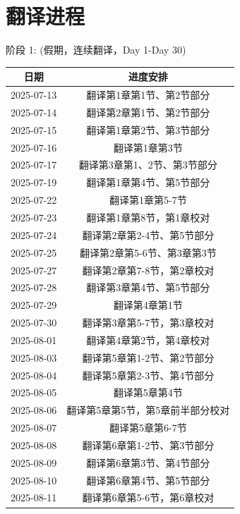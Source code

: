 \documentclass{ctexart}
\begin{document}
\section*{翻译进程}

阶段 1: (假期，连续翻译，Day 1-Day 30)

\begin{table}[h]
    \centering
    \begin{tabular}{|c|c|}
    \hline
    \textbf{日期} & \textbf{进度安排}  \\ \hline
    2025-07-13 & 翻译第1章第1节、第2节部分 \\ \hline
    2025-07-14 & 翻译第2章第1节、第2节部分 \\ \hline
    2025-07-15 & 翻译第1章第2节、第3节部分\\ \hline
    2025-07-16 & 翻译第1章第3节\\ \hline
    2025-07-17 & 翻译第3章第1、2节、第3节部分\\ \hline
    2025-07-19 & 翻译第1章第4节、第5节部分\\ \hline
    2025-07-22 & 翻译第1章第5-7节\\ \hline
    2025-07-23 & 翻译第1章第8节，第1章校对\\ \hline
    2025-07-24 & 翻译第2章第2-4节、第5节部分\\ \hline
    2025-07-25 & 翻译第2章第5-6节、第3章第3节\\ \hline
    2025-07-27 & 翻译第2章第7-8节，第2章校对\\ \hline
    2025-07-28 & 翻译第3章第4节、第5节部分\\ \hline
    2025-07-29 & 翻译第4章第1节\\ \hline
    2025-07-30 & 翻译第3章第5-7节，第3章校对\\ \hline
    2025-08-01 & 翻译第4章第2节，第4章校对\\ \hline
    2025-08-03 & 翻译第5章第1-2节、第2节部分\\ \hline
    2025-08-04 & 翻译第5章第2-3节、第4节部分\\ \hline
    2025-08-05 & 翻译第5章第4节\\ \hline
    2025-08-06 & 翻译第5章第5节，第5章前半部分校对\\ \hline
    2025-08-07 & 翻译第5章第6-7节\\ \hline
    2025-08-08 & 翻译第6章第1-2节、第3节部分\\ \hline
    2025-08-09 & 翻译第6章第3节、第4节部分\\ \hline
    2025-08-10 & 翻译第6章第4节、第5节部分\\ \hline
    2025-08-11 & 翻译第6章第5-6节，第6章校对\\ \hline
    \end{tabular}
\end{table}
\end{document}
